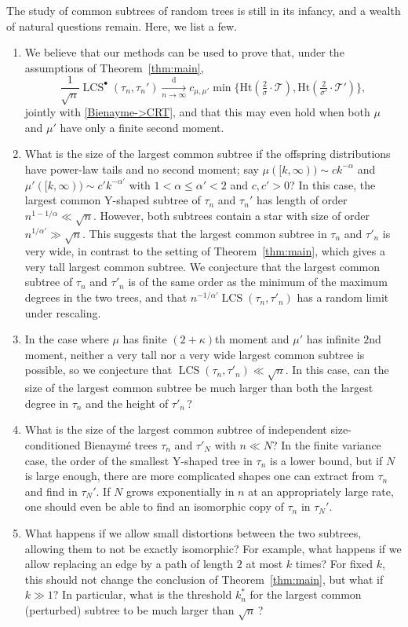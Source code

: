 \documentclass[11pt,reqno]{amsart}
\newcommand{\1}{\mathbf{1}}
\newcommand{\0}{\mathbf{0}}
\newcommand{\sT}{\mathscr{T}}
\newcommand{\Ht}{\mathrm{Ht}}
\newcommand{\LCS}{\operatorname{LCS}}
\begin{document}
The study of common subtrees of random trees is still in its infancy, and a wealth of natural  questions remain. Here, we list a few. 

\begin{enumerate}
    \item We believe that our methods can be used to prove that, under the assumptions of Theorem~\ref{thm:main},
    \[\frac{1}{\sqrt{n}}\LCS^\bullet(\tau_n,\tau_n') \xrightarrow[n\to\infty]{\mathrm d} c_{\mu,\mu'}\min\big\{\Ht(\tfrac{2}{\sigma}\cdot\sT),\Ht(\tfrac{2}{\sigma'}\cdot\sT')\big\},\]
    jointly with \eqref{Bienayme->CRT},
    and that this may even hold when both $\mu$ and $\mu'$ have only a finite second moment. 
    \item What is the size of the largest common subtree if the offspring distributions have power-law tails and no second moment; say $\mu([k,\infty))\sim c k^{-\alpha}$  and $\mu'([k,\infty))\sim c'k^{-\alpha'}$ with $1<\alpha\le \alpha'<2$ and $c,c'>0$? In this case, the largest common Y-shaped subtree of $\tau_n$ and $\tau_n'$ has length of order $n^{1-1/\alpha}\ll \sqrt{n}$. However, both subtrees contain a star with size of order $n^{1/\alpha'}\gg \sqrt{n}$. This suggests that the largest common subtree in $\tau_n$ and $\tau'_n$ is very wide, in contrast to the setting of Theorem~\ref{thm:main}, which gives a very tall largest common subtree. We conjecture that the largest common subtree of $\tau_n$ and $\tau'_n$ is of the same order as the minimum of the maximum degrees in the two trees, and that $n^{-1/\alpha'}\LCS(\tau_n,\tau'_n)$ has a random limit under rescaling. 
    \item In the case where $\mu$ has finite $(2+\kappa)$th moment and $\mu'$ has infinite $2$nd moment, neither a very tall nor a very wide largest common subtree is possible, so we conjecture that $\LCS(\tau_n,\tau'_n)\ll\sqrt{n}$. In this case, can the size of the largest common subtree be much larger than both the largest degree in $\tau_n$ and the height of $\tau'_n$\,?  
    \item What is the size of the largest common subtree of independent size-conditioned Bienaymé trees $\tau_n$ and $\tau'_N$ with $n\ll N$? In the finite variance case, the order of the smallest Y-shaped tree in $\tau_n$ is a lower bound, but if $N$ is large enough, there are more complicated shapes one can extract from $\tau_n$ and find in $\tau_N'$. If $N$ grows exponentially in $n$ at an appropriately large rate, one should even be able to find an isomorphic copy of $\tau_n$ in $\tau_N'$. 
    \item What happens if we allow small distortions between the two subtrees, allowing them to not be exactly isomorphic? For example, what happens if we allow replacing an edge by a path of length $2$ at most $k$ times? For fixed $k$, this should not change the conclusion of Theorem~\ref{thm:main}, but what if $k\gg1$? In particular, what is the threshold $k^*_n$ for the largest common (perturbed) subtree to be much larger than $\sqrt{n}$\,?

\end{enumerate}
\end{document}

